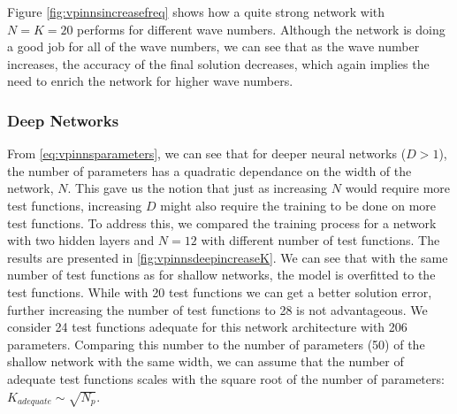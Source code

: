 Figure \ref{fig:vpinnsincreasefreq} shows how a quite strong network with $N=K=20$ performs for different wave numbers. Although the network is doing a good job for all of the wave numbers, we can see that as the wave number increases, the accuracy of the final solution decreases, which again implies the need to enrich the network for higher wave numbers.

\subsubsection{Deep Networks}\label{sec:deepnetworks}
From \eqref{eq:vpinnsparameters}, we can see that for deeper neural networks ($D>1$), the number of parameters has a quadratic dependance on the width of the network, $N$. This gave us the notion that just as increasing $N$ would require more test functions, increasing $D$ might also require the training to be done on more test functions. To address this, we compared the training process for a network with two hidden layers and $N=12$ with different number of test functions. The results are presented in \autoref{fig:vpinnsdeepincreaseK}. We can see that with the same number of test functions as for shallow networks, the model is overfitted to the test functions. While with 20 test functions we can get a better solution error, further increasing the number of test functions to 28 is not advantageous. We consider 24 test functions adequate for this network architecture with 206 parameters. Comparing this number to the number of parameters (50) of the shallow network with the same width, we can assume that the number of adequate test functions scales with the square root of the number of parameters: $K_{adequate} \sim \sqrt{N_p}$.

